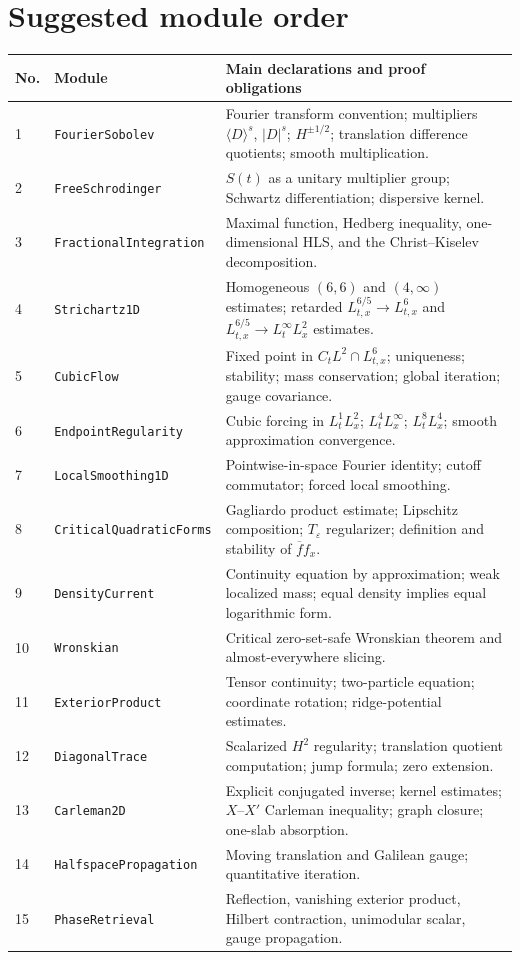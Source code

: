 \documentclass[11pt,oneside]{book}
\theoremstyle{definition}
\theoremstyle{remark}
\newcommand{\1}{\mathbf 1}
\newcommand{\eps}{\varepsilon}
\begin{document}
\section{Suggested module order}
\begin{longtable}{p{}p{}p{}}
\toprule
No. & Module & Main declarations and proof obligations\\
\midrule
\endhead
1 & \texttt{FourierSobolev} & Fourier transform convention; multipliers
$\langle D\rangle^s$, $|D|^s$; $H^{\pm1/2}$; translation difference
quotients; smooth multiplication.\\
2 & \texttt{FreeSchrodinger} & $S(t)$ as a unitary multiplier group;
Schwartz differentiation; dispersive kernel.\\
3 & \texttt{FractionalIntegration} & Maximal function, Hedberg inequality,
one-dimensional HLS, and the Christ--Kiselev decomposition.\\
4 & \texttt{Strichartz1D} & Homogeneous $(6,6)$ and $(4,\infty)$ estimates;
retarded $L^{6/5}_{t,x}\to L^6_{t,x}$ and $L^{6/5}_{t,x}\to L^\infty_tL^2_x$ estimates.\\
5 & \texttt{CubicFlow} & Fixed point in
$C_tL^2\cap L^6_{t,x}$; uniqueness; stability; mass conservation; global
iteration; gauge covariance.\\
6 & \texttt{EndpointRegularity} & Cubic forcing in $L^1_tL^2_x$;
$L^4_tL^\infty_x$; $L^8_tL^4_x$; smooth approximation convergence.\\
7 & \texttt{LocalSmoothing1D} & Pointwise-in-space Fourier identity;
cutoff commutator; forced local smoothing.\\
8 & \texttt{CriticalQuadraticForms} & Gagliardo product estimate;
Lipschitz composition; $T_\eps$ regularizer; definition and stability of
$\overline f f_x$.\\
9 & \texttt{DensityCurrent} & Continuity equation by approximation;
weak localized mass; equal density implies equal logarithmic form.\\
10 & \texttt{Wronskian} & Critical zero-set-safe Wronskian theorem and
almost-everywhere slicing.\\
11 & \texttt{ExteriorProduct} & Tensor continuity; two-particle equation;
coordinate rotation; ridge-potential estimates.\\
12 & \texttt{DiagonalTrace} & Scalarized $H^2$ regularity; translation
quotient computation; jump formula; zero extension.\\
13 & \texttt{Carleman2D} & Explicit conjugated inverse; kernel estimates;
$X$--$X'$ Carleman inequality; graph closure; one-slab absorption.\\
14 & \texttt{HalfspacePropagation} & Moving translation and Galilean gauge;
quantitative iteration.\\
15 & \texttt{PhaseRetrieval} & Reflection, vanishing exterior product,
Hilbert contraction, unimodular scalar, gauge propagation.\\
\bottomrule
\end{longtable}
\end{document}
